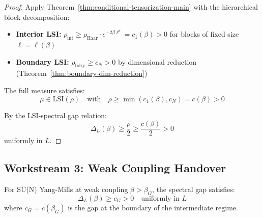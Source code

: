 \begin{proof}
Apply Theorem~\ref{thm:conditional-tensorization-main} with the hierarchical 
block decomposition:
\begin{itemize}
\item \textbf{Interior LSI:} $\rho_{\mathrm{int}} \geq \rho_{\mathrm{Haar}} \cdot e^{-2\beta\ell^d} = c_1(\beta) > 0$ 
for blocks of fixed size $\ell = \ell(\beta)$
\item \textbf{Boundary LSI:} $\rho_{\mathrm{bdry}} \geq c_N > 0$ by dimensional reduction 
(Theorem~\ref{thm:boundary-dim-reduction})
\end{itemize}

The full measure satisfies:
\[
\mu \in \mathrm{LSI}(\rho) \quad \text{with} \quad \rho \geq \min(c_1(\beta), c_N) = c(\beta) > 0
\]

By the LSI-spectral gap relation:
\[
\Delta_L(\beta) \geq \frac{\rho}{2} \geq \frac{c(\beta)}{2} > 0
\]
uniformly in $L$.
\end{proof}

\subsection{Workstream 3: Weak Coupling Handover}

\begin{theorem}
\label{thm:weak-strong-handover}
For SU(N) Yang-Mills at weak coupling $\beta > \beta_G$, the spectral gap 
satisfies:
\[
\Delta_L(\beta) \geq c_G > 0 \quad \text{uniformly in } L
\]
where $c_G = c(\beta_G)$ is the gap at the boundary of the intermediate regime.
\end{theorem}

